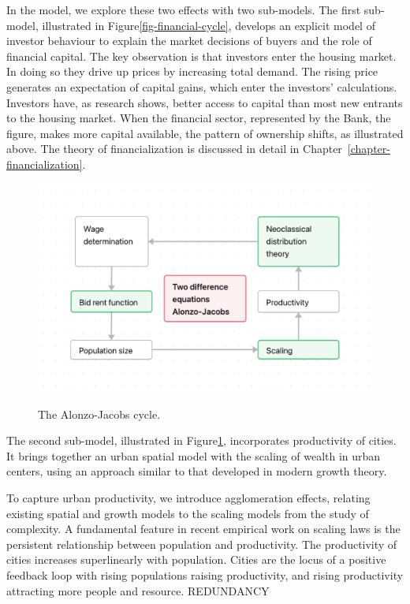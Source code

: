 In the model, we explore these two effects with two sub-models.
The first sub-model, illustrated in Figure\ref{fig-financial-cycle},  develops an explicit model of investor behaviour to explain the market decisions of buyers and the role of financial capital. 
The key observation is that investors enter the housing market. In doing so they drive up prices by increasing total demand. The rising price generates an expectation of capital gains, which enter the investors' calculations. Investors have, as research shows, better access to capital than most new entrants to the housing market. When the financial sector, represented by the Bank, the figure, %
makes more capital available, the pattern of ownership shifts, as illustrated above. The theory of financialization is discussed in detail in Chapter~\ref{chapter-financialization}.

\begin{figure}[!ht]
    \centering
    \includegraphics[scale=.7]{fig/flow_Alonzo-Jacobs_cycle.png}
    \label{fig-Alonzo-Jacobs-cycle}
\caption{The Alonzo-Jacobs cycle.}
\end{figure}

The second sub-model, illustrated in Figure\ref{fig-Alonzo-Jacobs-cycle}, incorporates  productivity of cities. It brings together an urban spatial model with the scaling of wealth in urban centers, using an approach similar to that developed in modern growth theory.

To capture urban productivity, we introduce %
agglomeration effects, relating existing spatial and growth models to the scaling models from the study of complexity. A fundamental feature in recent empirical work on scaling laws is %
the persistent relationship between population and productivity. The productivity of cities increases superlinearly with population. Cities are the locus of a positive feedback loop with rising populations raising productivity, and rising productivity attracting more people and resource. REDUNDANCY

